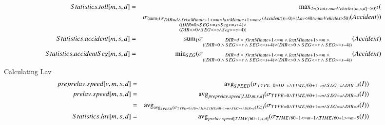 \begin{eqnarray*}
Statistics.toll[m, s, d] &=& 
\mathrm{max}_{ 2*(Stats.numVehicles[m,s,d] - 50)^2} ( \\&& \sigma_{\substack{(\mathrm{sum}_{1} (\sigma_{\substack { DIR = d \wedge fristMinute +1 <= m \wedge lastMinute + 1 >= m \wedge
\\ ((DIR = 0 \wedge SEG >= s \wedge Seg <= s +4) \vee \\(DIR <> 0 \wedge SEG <= s \wedge Seg >= s -4))}} (Accident))) = 0) \wedge (Lav < 40 \wedge numVehicles > 50)}} (Accident))\\
Statistics.accident[m, s, d] &=& 
\mathrm{sum}_{1} \sigma_{\substack{DIR = d \;\wedge\; firstMinute +1 <= m\; \wedge\; lastMinute +1 >= m \;\wedge\\ ((DIR = 0 \;\wedge\; SEG  >= s \;\wedge\; SEG <= s +4 ) \vee (DIR <> 0 \;\wedge\; SEG <= s \;\wedge\; SEG >= s-4))}} (Accident)\\
Statistics.accidentSeg[m, s, d] &=& \mathrm{min}_{SEG} (\sigma_{\substack{DIR = d \;\wedge\; firstMinute +1 <= m\; \wedge\; lastMinute +1 >= m \;\wedge\\ ((DIR = 0 \;\wedge\; SEG  >= s \;\wedge\; SEG <= s +4 ) \vee (DIR <> 0 \;\wedge\; SEG <= s \;\wedge\; SEG >= s-4))}} (Accident) \\
\end{eqnarray*}
%
Calculating Lav 
\begin{eqnarray*}
preprelav.speed[v, m, s, d] &=&
\algavg_{SPEED} (\sigma_ {TYPE=0 \wedge ID = v \wedge TIME/60 +1 = m \wedge SEG = s \wedge DIR = d } (I))\\
%
prelav.speed[m,s,d] &=& \algavg_{preprelav.speed[I.ID,m,s,d]} (\sigma_ {TYPE=0 \wedge TIME/60 +1 = m \wedge SEG = s \wedge DIR = d } (I))\\
&=&
\algavg_{\algavg_{SPEED} (\sigma_ {TYPE=0 \wedge ID = I.ID \wedge TIME/60 +1 = m \wedge SEG = s \wedge DIR = d } (I2))}(\sigma_ {TYPE=0 \wedge TIME/60 +1 = m \wedge SEG = s \wedge DIR = d } (I)) \\
%
Statistics.lav[m, s, d] &=& \algavg_{prelav.speed[TIME/60+1,s,d]} (\sigma_{TIME/60+1 <= m-1 \wedge TIME/60+1 >= m-5} (I))\\
\end{eqnarray*}
